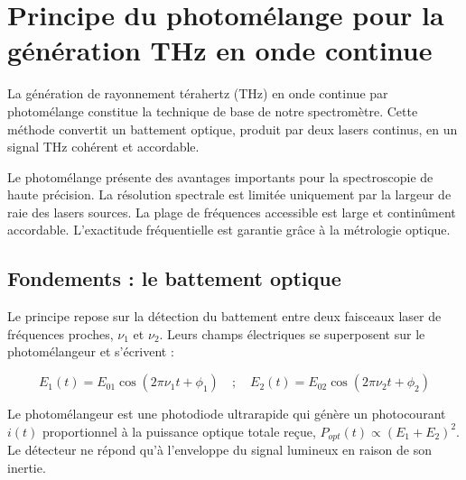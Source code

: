 



\section{Principe du photomélange pour la génération THz en onde continue}

La génération de rayonnement térahertz (THz) en onde continue par photomélange constitue la technique de base de notre spectromètre. Cette méthode convertit un battement optique, produit par deux lasers continus, en un signal THz cohérent et accordable. 

Le photomélange présente des avantages importants pour la spectroscopie de haute précision. La résolution spectrale est limitée uniquement par la largeur de raie des lasers sources. La plage de fréquences accessible est large et continûment accordable. L'exactitude fréquentielle est garantie grâce à la métrologie optique.

\subsection{Fondements : le battement optique}

Le principe repose sur la détection du battement entre deux faisceaux laser de fréquences proches, $\nu_1$ et $\nu_2$. Leurs champs électriques se superposent sur le photomélangeur et s'écrivent :

\begin{equation}
E_1(t) = E_{01} \cos(2\pi\nu_1 t + \phi_1) \quad ; \quad E_2(t) = E_{02} \cos(2\pi\nu_2 t + \phi_2)
\end{equation}

Le photomélangeur est une photodiode ultrarapide qui génère un photocourant $i(t)$ proportionnel à la puissance optique totale reçue, $P_{opt}(t) \propto (E_1 + E_2)^2$. Le détecteur ne répond qu'à l'enveloppe du signal lumineux en raison de son inertie. 

